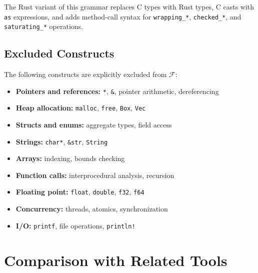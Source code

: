 \documentclass[11pt]{article}
\begin{document}
The Rust variant of this grammar replaces C types with Rust types,
C casts with \texttt{as} expressions, and adds method-call syntax for
\texttt{wrapping\_*}, \texttt{checked\_*}, and \texttt{saturating\_*}
operations.

\subsection{Excluded Constructs}

The following constructs are explicitly excluded from $\mathcal{F}$:
\begin{itemize}[nosep]
\item \textbf{Pointers and references:} \texttt{*}, \texttt{\&}, pointer
      arithmetic, dereferencing
\item \textbf{Heap allocation:} \texttt{malloc}, \texttt{free},
      \texttt{Box}, \texttt{Vec}
\item \textbf{Structs and enums:} aggregate types, field access
\item \textbf{Strings:} \texttt{char*}, \texttt{\&str}, \texttt{String}
\item \textbf{Arrays:} indexing, bounds checking
\item \textbf{Function calls:} interprocedural analysis, recursion
\item \textbf{Floating point:} \texttt{float}, \texttt{double}, \texttt{f32},
      \texttt{f64}
\item \textbf{Concurrency:} threads, atomics, synchronization
\item \textbf{I/O:} \texttt{printf}, file operations, \texttt{println!}
\end{itemize}

\section{Comparison with Related Tools}\label{app:comparison}
\end{document}
